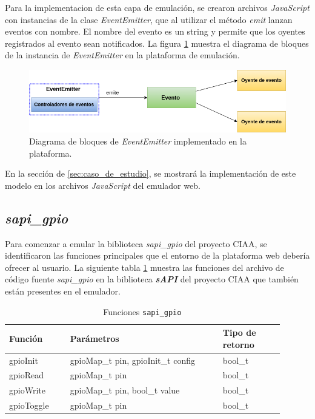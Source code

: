 Para la implementacion de esta capa de emulación, se crearon archivos \textit{JavaScript} con instancias de la clase \textit{EventEmitter}, que al utilizar el método \textit{emit} lanzan eventos con nombre. El nombre del evento es un string y permite que los oyentes registrados al evento sean notificados. La figura \ref{fig:EventemitterNodejs} muestra el diagrama de bloques de la instancia de \textit{EventEmitter} en la plataforma de emulación.

\begin{figure}[ht]
	\centering
	\includegraphics[scale=.49]{./Figures/EventemitterNodejs.png}
	\caption{Diagrama de bloques de \textit{EventEmitter} implementado en la plataforma.}
	\label{fig:EventemitterNodejs}
\end{figure}

En la sección de \ref{sec:caso_de_estudio}, se mostrará la implementación de este modelo en los archivos \textit{JavaScript} del emulador web.

\subsection{\textit{\textbf{sapi\_gpio}}}

Para comenzar a emular la biblioteca \textit{sapi\_gpio} del proyecto CIAA, se identificaron las funciones principales que el entorno de la plataforma web debería ofrecer al usuario. La siguiente tabla \ref{tab:sapiGPIO} muestra las funciones del archivo de código fuente \textit{sapi\_gpio} en la biblioteca \textit{\textbf{sAPI}} del proyecto CIAA que también están presentes en el emulador.


\begin{table}[h]
	\centering
	\caption[Funciones \texttt{sapi\_gpio}]{Funciones \texttt{sapi\_gpio}}
	\begin{tabular}{p{0.20\linewidth} p{0.50\linewidth}  p{0.20\linewidth}}    
		\toprule
		\textbf{Función} 	 & \textbf{Parámetros} 		& \textbf{Tipo de retorno}  \\
		\midrule
		gpioInit & gpioMap\_t pin, gpioInit\_t config 		&  bool\_t \\		
		gpioRead	 & gpioMap\_t pin			&  bool\_t \\
		gpioWrite	 & gpioMap\_t pin, bool\_t value			& bool\_t \\
		gpioToggle	 & gpioMap\_t pin				&  bool\_t \\
		\bottomrule
		\hline
	\end{tabular}
	\label{tab:sapiGPIO}
\end{table}


